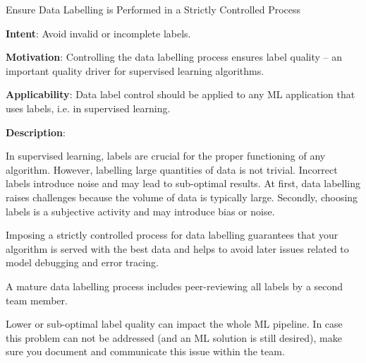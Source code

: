   
  \begin{frame}[plain]{ Ensure Data Labelling is Performed in a Strictly Controlled Process
 }

  \textbf{Intent}: Avoid invalid or incomplete labels. 
 

  \textbf{Motivation}: Controlling the data labelling process ensures label quality -- an important quality driver for supervised learning algorithms. 
 

  \textbf{Applicability}: Data label control should be applied to any ML application that uses labels, i.e. in supervised learning.
 

  \textbf{Description}: 

In supervised learning, labels are crucial for the proper functioning of any algorithm.
However, labelling large quantities of data is not trivial.
Incorrect labels introduce noise and may lead to sub-optimal results.
At first, data labelling raises challenges because the volume of data is typically large.
Secondly, choosing labels is a subjective activity and may introduce bias or noise.


Imposing a strictly controlled process for data labelling guarantees that your algorithm is served with the best data and helps to avoid later issues related to model debugging and error tracing.


A mature data labelling process includes peer-reviewing all labels by a second team member.


Lower or sub-optimal label quality can impact the whole ML pipeline.
In case this problem can not be addressed (and an ML solution is still desired), make sure you document and communicate this issue within the team.


 


  \end{frame}

